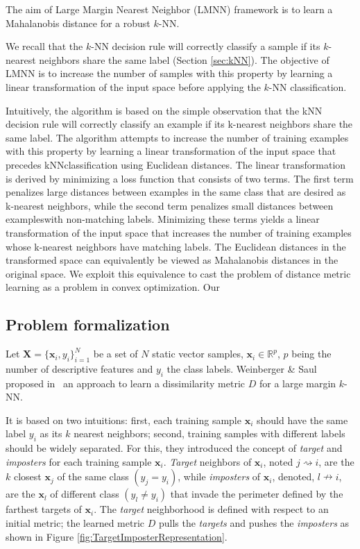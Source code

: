 The aim of Large Margin Nearest Neighbor (LMNN) framework is to learn a Mahalanobis distance for a robust $k$-NN. 

We recall that the $k$-NN decision rule will correctly classify a sample if its $k$-nearest neighbors share the same label (Section \ref{sec:kNN}). The objective of LMNN is to increase the number of samples with this property by learning a linear transformation of the input space before applying the $k$-NN classification.

Intuitively, the algorithm is based on the simple observation that the kNN decision rule will correctly classify an example if its k-nearest neighbors share the same label. The algorithm attempts to increase the number of training examples with this property by learning a linear transformation of the input space that precedes kNNclassification using Euclidean distances. The linear transformation is derived by minimizing a loss function that consists of two terms. The first term penalizes large distances between examples in the same class that are desired as k-nearest neighbors, while the second term penalizes small distances between exampleswith non-matching labels. Minimizing these terms yields a linear transformation of the input space that increases the number of training examples whose k-nearest neighbors have matching labels. The Euclidean distances in the transformed space can equivalently be viewed as Mahalanobis distances in the original space. We exploit this equivalence to cast the problem of distance metric learning as a problem in convex optimization. Our



\subsection{Problem formalization}
Let $\textbf{X}=\{\textbf{x}_i,y_i\}_{i=1}^N$ be a set of $N$ static vector samples, ${\textbf{x}_i \in \mathbb{R}^{p}}$, $p$ being the number of descriptive features and $y_i$ the class labels. Weinberger \& Saul proposed in~\cite{Weinberger2009} an approach to learn a dissimilarity metric $D$ for a large margin $k$-NN. 

It is based on two intuitions: first, each training sample $\textbf{x}_i$ should have the same label $y_i$ as its $k$ nearest neighbors; second, training samples with different labels should be widely separated. For this, they introduced the concept of \textit{target} and \textit{imposters} for each training sample $\textbf{x}_i$. \textit{Target} neighbors of $\textbf{x}_i$, noted $j \rightsquigarrow i$, are the $k$ closest $\textbf{x}_j$ of the same class $(y_j=y_i)$, while \textit{imposters} of $\textbf{x}_i$, denoted, $l \nrightarrow i$, are the $\textbf{x}_l$ of different class $(y_l \neq y_i)$ that invade the perimeter defined by the farthest targets of $\textbf{x}_i$. The \textit{target} neighborhood is defined with respect to an initial metric; the learned metric $D$ pulls the \textit{targets} and pushes the \textit{imposters} as shown in Figure \ref{fig:TargetImposterRepresentation}.


